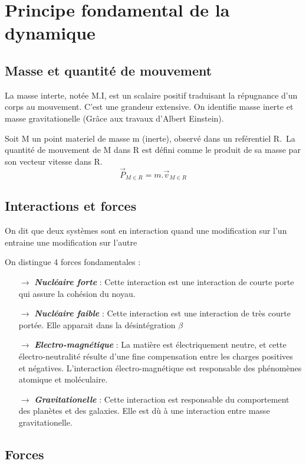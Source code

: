 \chapter{Principe fondamental de la dynamique}
\section{Masse et quantité de mouvement}
\begin{de}
La masse interte, notée M.I, est un scalaire positif traduisant la répugnance d'un corps au mouvement. C'est une grandeur extensive. On identifie masse inerte et masse gravitationelle (Grâce aux travaux d'Albert Einstein).
\end{de}
\begin{de}
Soit M un point materiel de masse m (inerte), observé dans un reférentiel R.\
La quantité de mouvement de M dans R est défini comme le produit de sa masse par son vecteur vitesse dans R.
$$\overrightarrow{P}_{M \in R} = m.\overrightarrow{v}_{M \in R}$$
\end{de}
\section{Interactions et forces}
\begin{de}
 On dit que deux systèmes sont en interaction quand une modification sur l'un entraine une modification sur l'autre
\end{de}
On distingue 4 forces fondamentales :
\begin{itemize}
 \item[$\rightarrow$] \textbf{\textit{Nucléaire forte}} : Cette interaction est une interaction de courte porte qui assure la cohésion du noyau.
 \item[$\rightarrow$] \textbf{\textit{Nucléaire faible}} : Cette interaction est une interaction de très courte portée. Elle apparait dans la désintégration $\beta$
 \item[$\rightarrow$]\textit{\textbf{Electro-magnétique}} : La matière est électriquement neutre, et cette électro-neutralité résulte d'une fine compensation entre les charges positives et négatives. L'interaction électro-magnétique est responsable des phénomènes atomique et moléculaire.
 \item[$\rightarrow$] \textit{\textbf{Gravitationelle}} : Cette interaction est responsable du comportement des planètes et des galaxies. Elle est dù à une interaction entre masse gravitationelle.
\end{itemize}
\section{Forces}
